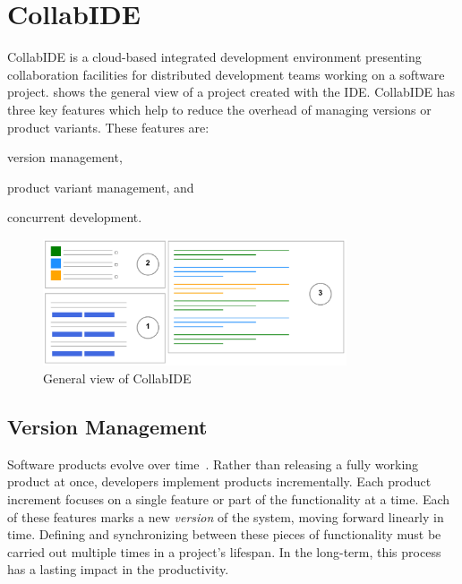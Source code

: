 
\section{CollabIDE}
\label{sec:collab-ide}

CollabIDE is a cloud-based integrated development environment presenting collaboration facilities 
for distributed development teams working on a software project.  shows the 
general view of a project created with the IDE. 
CollabIDE has three key features which help to reduce the overhead of managing versions or product variants. These features are:
\begin{enumerate*}[label=(\arabic*)] 
\item version management, 
\item product variant management, and 
\item concurrent development.
\end{enumerate*}

\begin{figure}[tbp]
  \centering
  \includegraphics[width=0.8\textwidth]{img/collabIDEGeneral}
  \caption{General view of CollabIDE}
  \label{fig:general-view}
\end{figure}

\subsection{Version Management}
\label{sec:vcs}
Software products evolve over time~\cite{lehman02}. Rather than releasing a fully working product at 
once, developers implement products incrementally. Each product increment focuses on a single 
feature or part of the functionality at a time. Each of these features marks a new \emph{version} of the 
system, moving forward linearly in time. Defining and synchronizing between these pieces of 
functionality must be carried out multiple times in a project's lifespan. In the long-term, this process 
has a lasting impact in the productivity.

